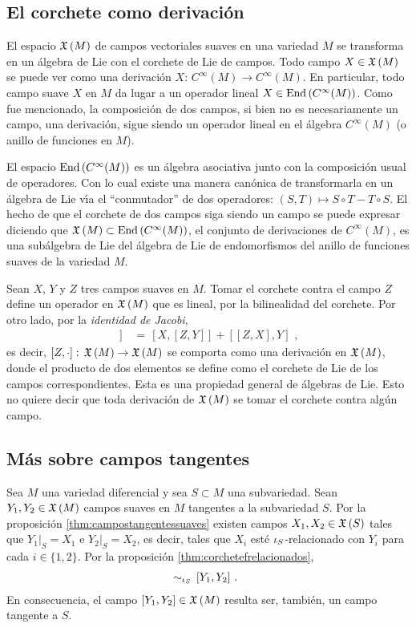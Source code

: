 \subsection{El corchete como derivaci\'{o}n}
El espacio $\champs{M}$ de campos vectoriales suaves en una variedad $M$
se transforma en un \'{a}lgebra de Lie con el corchete de Lie de campos.
Todo campo $X\in\champs{M}$ se puede ver como una derivaci\'{o}n
$X:\,C^{\infty}(M)\rightarrow C^{\infty}(M)$. En particular, todo
campo suave $X$ en $M$ da lugar a un operador lineal
$X\in\End{C^{\infty}(M)}$. Como fue mencionado, la composici\'{o}n de dos
campos, si bien no es necesariamente un campo, una derivaci\'{o}n, sigue
siendo un operador lineal en el \'{a}lgebra $C^{\infty}(M)$ (o anillo de
funciones en $M$).

El espacio $\End{C^{\infty}(M)}$ es un \'{a}lgebra asociativa junto con la
composici\'{o}n usual de operadores. Con lo cual existe una manera
can\'{o}nica de transformarla en un \'{a}lgebra de Lie v\'{\i}a el
``conmutador'' de dos operadores: $(S,T)\mapsto S\circ T-T\circ S$.
El hecho de que el corchete de dos campos siga siendo un campo se puede
expresar diciendo que $\champs{M}\subset\End{C^{\infty}(M)}$, el conjunto
de derivaciones de $C^{\infty}(M)$, es una sub\'{a}lgebra de Lie del
\'{a}lgebra de Lie de endomorfismos del anillo de funciones suaves de la
variedad $M$.

Sean $X$, $Y$ y $Z$ tres campos suaves en $M$. Tomar el corchete contra
el campo $Z$ define un operador en $\champs{M}$ que es lineal, por
la bilinealidad del corchete. Por otro lado, por la \emph{identidad de %
Jacobi},
\begin{align*}
	[Z,[X,Y]] & \,=\,[X,[Z,Y]]+[[Z,X],Y]
	\text{ ,}
\end{align*}
%
es decir, $[Z,\cdot]:\,\champs{M}\rightarrow\champs{M}$ se comporta como
una derivaci\'{o}n en $\champs{M}$, donde el producto de dos elementos
se define como el corchete de Lie de los campos correspondientes. Esta
es una propiedad general de \'{a}lgebras de Lie. Esto no quiere decir que
toda derivaci\'{o}n de $\champs{M}$ se tomar el corchete contra alg\'{u}n
campo.

\subsection{M\'{a}s sobre campos tangentes}
Sea $M$ una variedad diferencial y sea $S\subset M$ una subvariedad.
Sean $Y_{1},Y_{2}\in\champs{M}$ campos suaves en $M$ tangentes a la
subvariedad $S$. Por la proposici\'{o}n \ref{thm:campostangentessuaves}
existen campos $X_{1},X_{2}\in\champs{S}$ tales que
$Y_{1}|_{S}=X_{1}$ e $Y_{2}|_{S}=X_{2}$, es decir, tales que $X_{i}$
est\'{e} $\inc[S]$-relacionado con $Y_{i}$ para cada $i\in\{1,2\}$.
Por la proposici\'{o}n \ref{thm:corchetefrelacionados},
\begin{align*}
	[X_{1},X_{2}] &\,\sim_{\inc[S]}\,[Y_{1},Y_{2}]
	\text{ .}
\end{align*}
%
En consecuencia, el campo $[Y_{1},Y_{2}]\in\champs{M}$ resulta ser,
tambi\'{e}n, un campo tangente a $S$.

